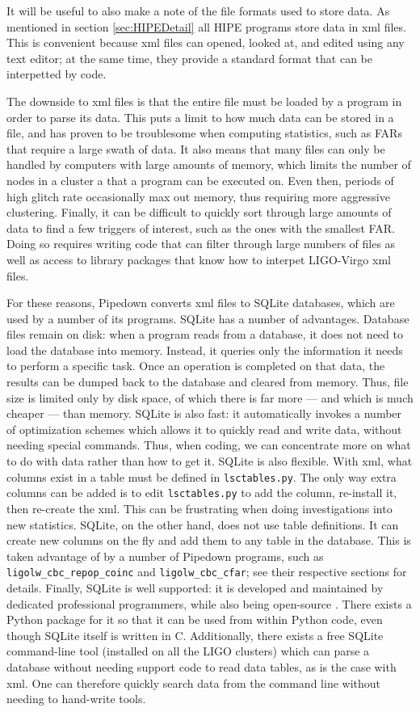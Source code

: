 It will be useful to also make a note of the file formats used to store data. As mentioned in section \ref{sec:HIPEDetail} all \ac{HIPE} programs store data in xml files. This is convenient because xml files can opened, looked at, and edited using any text editor; at the same time, they provide a standard format that can be interpetted by code.

The downside to xml files is that the entire file must be loaded by a program in order to parse its data. This puts a limit to how much data can be stored in a file, and has proven to be troublesome when computing statistics, such as \acp{FAR} that require a large swath of data. It also means that many files can only be handled by computers with large amounts of memory, which limits the number of nodes in a cluster a that a program can be executed on. Even then, periods of high glitch rate occasionally max out memory, thus requiring more aggressive clustering. Finally, it can be difficult to quickly sort through large amounts of data to find a few triggers of interest, such as the ones with the smallest \ac{FAR}. Doing so requires writing code that can filter through large numbers of files as well as access to library packages that know how to interpet \ac{LIGO}-Virgo xml files.

For these reasons, Pipedown converts xml files to SQLite databases, which are used by a number of its programs. SQLite has a number of advantages. Database files remain on disk: when a program reads from a database, it does not need to load the database into memory. Instead, it queries only the information it needs to perform a specific task. Once an operation is completed on that data, the results can be dumped back to the database and cleared from memory. Thus, file size is limited only by disk space, of which there is far more --- and which is much cheaper --- than memory. SQLite is also fast: it automatically invokes a number of optimization schemes which allows it to quickly read and write data, without needing special commands. Thus, when coding, we can concentrate more on what to do with data rather than how to get it. SQLite is also flexible. With xml, what columns exist in a table must be defined in \verb|lsctables.py|. The only way extra columns can be added is to edit \verb|lsctables.py| to add the column, re-install it, then re-create the xml. This can be frustrating when doing investigations into new statistics. SQLite, on the other hand, does not use table definitions. It can create new columns on the fly and add them to any table in the database. This is taken advantage of by a number of Pipedown programs, such as \verb|ligolw_cbc_repop_coinc| and \verb|ligolw_cbc_cfar|; see their respective sections for details. Finally, SQLite is well supported: it is developed and maintained by dedicated professional programmers, while also being open-source \cite{ref:SQLiteSite}. There exists a Python package for it so that it can be used from within Python code, even though SQLite itself is written in C. Additionally, there exists a free SQLite command-line tool (installed on all the \ac{LIGO} clusters) which can parse a database without needing support code to read data tables, as is the case with xml. One can therefore quickly search data from the command line without needing to hand-write tools.

